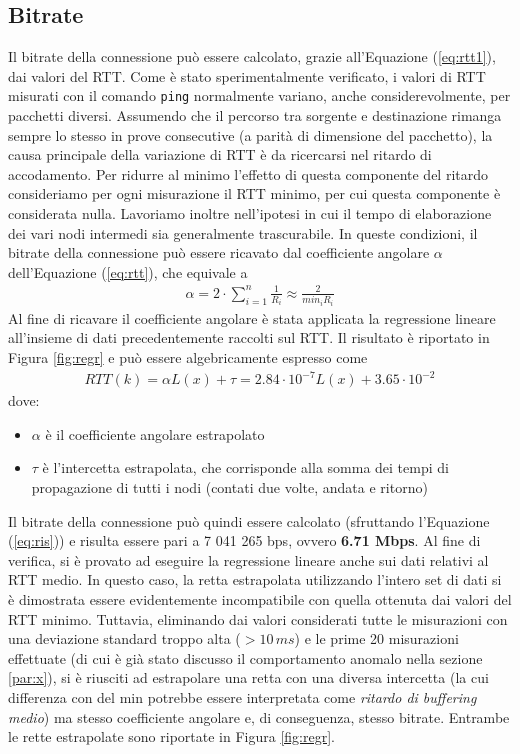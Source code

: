 \documentclass[a4paper,10pt]{article}
\begin{document}
\subsection{Bitrate}
Il bitrate della connessione può essere calcolato, grazie all'Equazione (\ref{eq:rtt1}), dai valori del RTT. Come è stato sperimentalmente verificato, i valori di RTT misurati con il comando \texttt{ping} normalmente variano, anche considerevolmente, per pacchetti diversi. Assumendo che il percorso tra sorgente e destinazione rimanga sempre lo stesso in prove consecutive (a parità di dimensione del pacchetto), la causa principale della variazione di RTT è da ricercarsi nel ritardo di accodamento. Per ridurre al minimo l'effetto di questa componente del ritardo consideriamo per ogni misurazione il RTT minimo, per cui questa componente è considerata nulla. Lavoriamo inoltre nell'ipotesi in cui il tempo di elaborazione dei vari nodi intermedi sia generalmente trascurabile. In queste condizioni, il bitrate della connessione può essere ricavato dal coefficiente angolare $\alpha$ dell'Equazione (\ref{eq:rtt}), che equivale a
\begin{align}
\alpha = 2 \cdot \sum_{i=1}^{n}  \frac{1}{R_i} \approx \frac{2}{min_i R_i}
\label{eq:ris}
\end{align}
Al fine di ricavare il coefficiente angolare è stata applicata la regressione lineare all'insieme di dati precedentemente raccolti sul RTT. Il risultato è riportato in Figura \ref{fig:regr} e può essere algebricamente espresso come
\begin{align}
RTT(k) = \alpha L(x) + \tau = 2.84 \cdot 10^{-7}  L(x) + 3.65 \cdot 10^{-2}
\end{align}
dove:
\begin{itemize}
\item $\alpha$ è il coefficiente angolare estrapolato
\item $\tau$ è l'intercetta estrapolata, che corrisponde alla somma dei tempi di propagazione di tutti i nodi (contati due volte, andata e ritorno)
\end{itemize}
\noindent
Il bitrate della connessione può quindi essere calcolato (sfruttando l'Equazione (\ref{eq:ris})) e risulta essere pari a 7 041 265 bps, ovvero \textbf{6.71 Mbps}. Al fine di verifica, si è provato ad eseguire la regressione lineare anche sui dati relativi al RTT medio. In questo caso, la retta estrapolata utilizzando l'intero set di dati si è dimostrata essere evidentemente incompatibile con quella ottenuta dai valori del RTT minimo. Tuttavia, eliminando dai valori considerati tutte le misurazioni con una deviazione standard troppo alta ($>10\,ms$) e le prime 20 misurazioni effettuate (di cui è già stato discusso il comportamento anomalo nella sezione \ref{par:x}), si è riusciti ad estrapolare una retta con una diversa intercetta (la cui differenza con del min potrebbe essere interpretata come \textit{ritardo di buffering medio}) ma stesso coefficiente angolare e, di conseguenza, stesso bitrate. Entrambe le rette estrapolate sono riportate in Figura \ref{fig:regr}.
\end{document}
